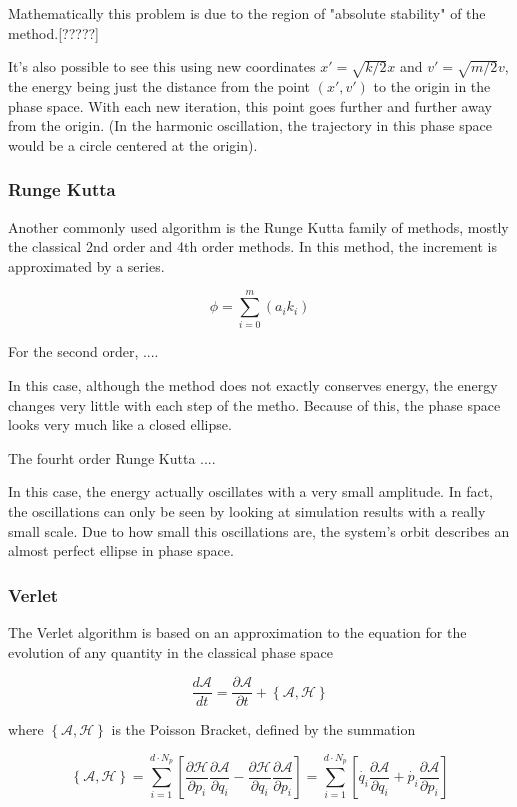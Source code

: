 Mathematically this problem is due to the region of "absolute stability" of the method.[?????]

It's also possible to see this using new coordinates $x' = \sqrt{k/2}x$ and $v' = \sqrt{m/2}v$, the energy being just the distance from the point $(x',v')$ to the origin in the phase space. With each new iteration, this point goes further and further away from the origin.
(In the harmonic oscillation, the trajectory in this phase space would be a circle centered at the origin).


\subsubsection{Runge Kutta}

Another commonly used algorithm is the Runge Kutta family of methods, mostly the classical 2nd order and 4th order methods. In this method, the increment is approximated by a series.

$$\phi = \sum_{i=0}^{m}(a_i k_i)$$

For the second order, ....

In this case, although the method does not exactly conserves energy, the energy changes very little with each step of the metho. Because of this, the phase space looks very much like a closed ellipse.

The fourht order Runge Kutta ....

In this case, the energy actually oscillates with a very small amplitude. In fact, the oscillations can only be seen by looking at simulation results with a really small scale. Due to how small this oscillations are, the system's orbit describes an almost perfect ellipse in phase space.

\subsubsection{Verlet}

The Verlet algorithm is based on an approximation to the equation for the evolution of any quantity in the classical phase space

$$\frac{d \mathcal{A}}{dt} = \frac{\partial \mathcal{A}}{\partial t} + \left\{\mathcal{A}, \mathcal{H} \right\}$$

where $\left\{\mathcal{A}, \mathcal{H} \right\}$ is the Poisson Bracket, defined by the summation

$$\left\{\mathcal{A}, \mathcal{H} \right\} = \sum_{i=1}^{d\cdot N_p} \left[ \frac{\partial \mathcal{H}}{\partial p_i}\frac{\partial \mathcal{A}}{\partial q_i} - \frac{\partial \mathcal{H}}{\partial q_i}\frac{\partial \mathcal{A}}{\partial p_i}\right] = \sum_{i=1}^{d\cdot N_p} \left[ \Dot{q_i} \frac{\partial \mathcal{A}}{\partial q_i} + \Dot{p_i}\frac{\partial \mathcal{A}}{\partial p_i}\right]$$

